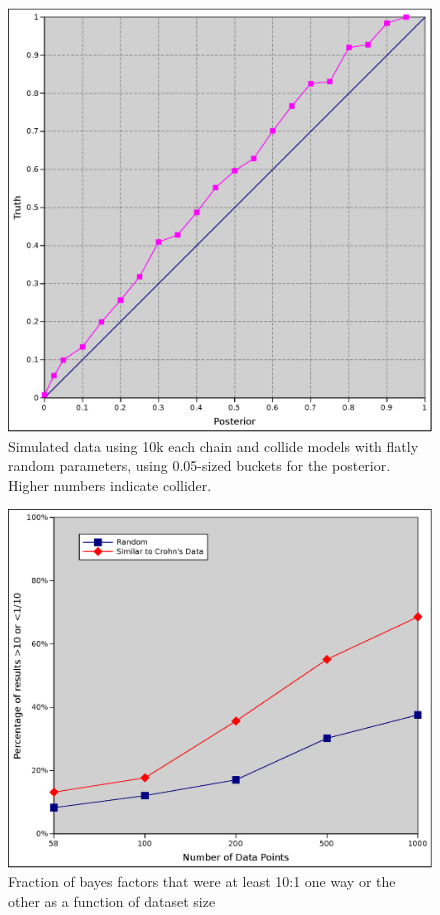 \documentclass[twocolumn,12pt]{article}
\begin{document}
\begin{figure}
  \includegraphics[width=\textwidth]{direction_platonic_58}
  \caption{Simulated data using 10k each chain and collide models with
    flatly random parameters, using 0.05-sized buckets for the
    posterior.  Higher numbers indicate collider.}
  \label{dir_pla58}
\end{figure}

\begin{figure}
  \includegraphics[width=\textwidth]{usefullness}
  \caption{Fraction of bayes factors that were at least 10:1 one way
    or the other as a function of dataset size}
  \label{dir_use}
\end{figure}
\end{document}
